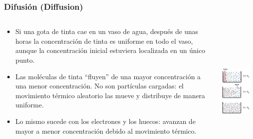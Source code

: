 \documentclass[10pt,t,aspectratio=169]{beamer}
\begin{document}
\begin{frame}[t]
\begin{columns}
\begin{column}{0.5\textwidth}
        \end{column}
        
    \end{columns}
    
\end{frame}


\begin{frame}[t]
    \frametitle{Difusión (Diffusion)}

    \begin{columns}
    
        \begin{column}{0.5\textwidth}
        
            \begin{itemize}
                \item Si una gota de tinta cae en un vaso de agua, después de unas horas la concentración de tinta es uniforme en todo el vaso, aunque la concentración inicial estuviera localizada en un único punto.
                \item Las moléculas de tinta ``fluyen'' de una mayor concentración a una menor concentración. No son partículas cargadas: el movimiento térmico aleatorio las mueve y distribuye de manera uniforme.
                \item Lo mismo sucede con los electrones y los huecos: avanzan de mayor a menor concentración debido al movimiento térmico.
            \end{itemize}
            
        \end{column}
        
        \begin{column}{0.5\textwidth}
        
            \centering
            \includegraphics[height=7cm]{./figures/difusion.pdf}
            
        \end{column}
        
    \end{columns}
    
\end{frame}
\end{document}
